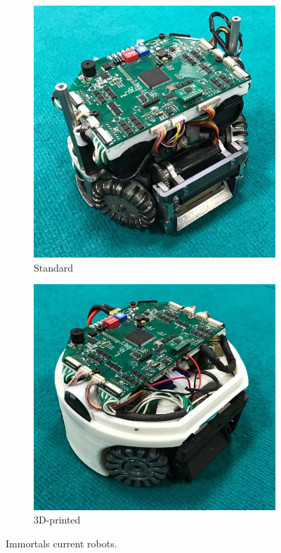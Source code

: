 \documentclass[runningheads]{llncs}
\begin{document}
\begin{figure}
    \centering
    \begin{subfigure}[b]{0.45\textwidth}
         \centering
         \includegraphics[width=\textwidth]{images/std_robot.jpeg}
         \caption{Standard}
         \label{fig:robot_std}
    \end{subfigure}
    \hfill
    \begin{subfigure}[b]{0.5\textwidth}
        \centering
        \includegraphics[width=\textwidth]{images/printed_robot.jpeg}
        \caption{3D-printed}
        \label{fig:robot_printed}
    \end{subfigure}
    \caption{Immortals current robots.}
    \label{fig:std_robot}
\end{figure}
\end{document}
